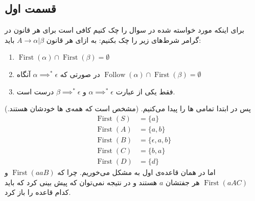 \documentclass[]{article}
\begin{document}
\subsection*{قسمت اول}
برای اینکه مورد خواسته شده در سوال را چک کنیم کافی است برای هر قانون در گرامر شرط‌های زیر را چک
بکنیم: به ازای هر قانون
$A \rightarrow \alpha | \beta$
باید:
\begin{enumerate}
    \item $\operatorname{First}(\alpha) \cap \operatorname{First}(\beta) = \emptyset$
    \item در صورتی که $\alpha \implies^* \epsilon$ آنگاه  $\operatorname{Follow}(\alpha) \cap \operatorname{First}(\beta) = \emptyset$
    \item فقط یکی از عبارت $\alpha \implies^* \epsilon$ و $\beta \implies^* \epsilon$ درست است.
\end{enumerate}
پس در ابتدا
تمامی
ها
را پیدا می‌کنیم. (مشخص است که  همه‌ی ها خودشان هستند.)
\begin{align*}
    \operatorname{First}(S) &= \{a\}\\
    \operatorname{First}(A) &= \{a, b\}\\
    \operatorname{First}(B) &= \{\epsilon, a, b\}\\
    \operatorname{First}(C) &= \{b, a\}\\
    \operatorname{First}(D) &= \{d\}
\end{align*}
اما در همان قاعده‌ی اول به مشکل می‌خوریم. چرا که
$\operatorname{First}(aaB)$ و $\operatorname{First}(aAC)$
هر جفتشان
$a$
هستند و در نتیجه نمی‌توان که پیش بینی کرد که باید کدام قاعده را باز کرد.
\end{document}

